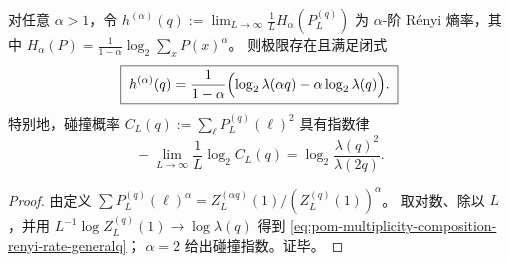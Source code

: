 \begin{proposition}\label{prop:pom-multiplicity-composition-renyi-collision-generalq}
对任意 \(\alpha>1\)，令
\(
h^{(\alpha)}(q):=\lim_{L\to\infty}\frac{1}{L}H_\alpha(P_L^{(q)})
\)
为 \(\alpha\)-阶 Rényi 熵率，其中
\(
H_\alpha(P)=\frac{1}{1-\alpha}\log_2\sum_x P(x)^\alpha
\)。
则极限存在且满足闭式
\begin{equation}\label{eq:pom-multiplicity-composition-renyi-rate-generalq}
\boxed{\;
h^{(\alpha)}(q)=\frac{1}{1-\alpha}\Bigl(\log_2\lambda(\alpha q)-\alpha\log_2\lambda(q)\Bigr).\;}
\end{equation}
特别地，碰撞概率
\(
C_L(q):=\sum_{\boldsymbol{\ell}}P_L^{(q)}(\boldsymbol{\ell})^2
\)
具有指数律
\[
\boxed{\;
-\lim_{L\to\infty}\frac{1}{L}\log_2 C_L(q)=\log_2\frac{\lambda(q)^2}{\lambda(2q)}.\;}
\]
\end{proposition}
\begin{proof}
由定义
\(
\sum P_L^{(q)}(\boldsymbol{\ell})^\alpha
=Z_L^{(\alpha q)}(1)/(Z_L^{(q)}(1))^\alpha
\)。
取对数、除以 \(L\)，并用
\(
L^{-1}\log Z_L^{(q)}(1)\to \log\lambda(q)
\)
得到 \eqref{eq:pom-multiplicity-composition-renyi-rate-generalq}；
\(\alpha=2\) 给出碰撞指数。证毕。
\end{proof}

